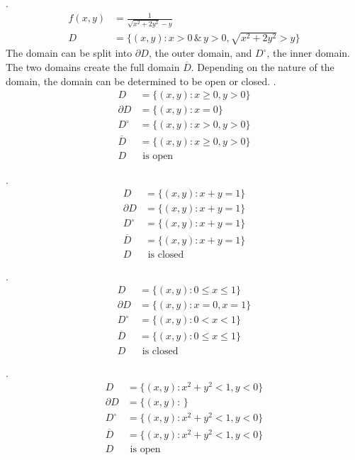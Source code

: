 \documentclass{article}
\newcommand{\n}{\leavevmode \newline} %
\newcommand{\nn}{\leavevmode \newline \newline} %
\numberwithin{equation}{subsection} %
\begin{document}
.
\begin{equation}
    \begin{split}
        f(x,y)&=\frac{1}{\sqrt{x^2+2y^2}-y}\\
        D&=\{(x,y):x>0\,\&\,y>0,\sqrt{x^2+2y^2}>y\}
    \end{split}
\end{equation}
\n
The domain can be split into $\partial D$, the outer domain, and $D^{\circ}$, the inner domain. The two domains create the full domain $\overline{D}$. Depending on the nature of the domain, the domain can be determined to be open or closed.
\nn
{}.
\begin{equation}
    \begin{split}
        D&=\{(x,y):x\geq0,y>0\}\\
        \partial D&=\{(x,y):x=0\}\\
        D^{\circ}&=\{(x,y):x>0,y>0\}\\
        \overline{D}&=\{(x,y):x\geq0,y>0\}\\
        D&\text{ is open}
    \end{split}
\end{equation}

.
\begin{equation}
    \begin{split}
        D&=\{(x,y):x+y=1\}\\
        \partial D&=\{(x,y):x+y=1\}\\
        D^{\circ}&=\{(x,y):x+y=1\}\\
        \overline{D}&=\{(x,y):x+y=1\}\\
        D&\text{ is closed}
    \end{split}
\end{equation}

.
\begin{equation}
    \begin{split}
        D&=\{(x,y):0\leq x\leq 1\}\\
        \partial D&=\{(x,y):x=0,x=1\}\\
        D^{\circ}&=\{(x,y):0<x<1\}\\
        \overline{D}&=\{(x,y):0\leq x\leq 1\}\\
        D&\text{ is closed}
    \end{split}
\end{equation}

.
\begin{equation}
    \begin{split}
        D&=\{(x,y):x^2+y^2<1,y<0\}\\
        \partial D&=\{(x,y):\,\}\\
        D^{\circ}&=\{(x,y):x^2+y^2<1,y<0\}\\
        \overline{D}&=\{(x,y):x^2+y^2<1,y<0\}\\
        D&\text{ is open}
    \end{split}
\end{equation}
\end{document}
